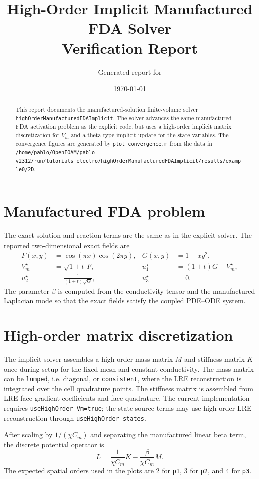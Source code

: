 \documentclass[11pt,a4paper]{article}
\title{High-Order Implicit Manufactured FDA Solver\\Verification Report}
\author{Generated report for \code{highOrderManufacturedFDAImplicit}}
\date{\today}
\newcommand{\code}[1]{\texttt{#1}}
\begin{document}
\maketitle

\begin{abstract}
This report documents the manufactured-solution finite-volume solver \code{highOrderManufacturedFDAImplicit}. The solver advances the same manufactured FDA activation problem as the explicit code, but uses a high-order implicit matrix discretization for $V_m$ and a theta-type implicit update for the state variables. The convergence figures are generated by \code{plot\_convergence.m} from the data in \code{/home/pablo/OpenFOAM/pablo-v2312/run/tutorials\_electro/highOrderManufacturedFDAImplicit/results/example0/2D}.
\end{abstract}

\section{Manufactured FDA problem}
The exact solution and reaction terms are the same as in the explicit solver. The reported two-dimensional exact fields are
\begin{align}
F(x,y) &= \cos(\pi x)\cos(2\pi y), & G(x,y) &= 1+xy^2,\\
V_m^{\star} &= \sqrt{1+t}\,F, &
u_1^{\star} &= (1+t)G+V_m^{\star},\\
u_2^{\star} &= \frac{1}{(1+t)\sqrt{G}}, &
u_3^{\star} &= 0.
\end{align}
The parameter $\beta$ is computed from the conductivity tensor and the manufactured Laplacian mode so that the exact fields satisfy the coupled PDE--ODE system.

\section{High-order matrix discretization}
The implicit solver assembles a high-order mass matrix $M$ and stiffness matrix $K$ once during setup for the fixed mesh and constant conductivity. The mass matrix can be \code{lumped}, i.e. diagonal, or \code{consistent}, where the LRE reconstruction is integrated over the cell quadrature points. The stiffness matrix is assembled from LRE face-gradient coefficients and face quadrature. The current implementation requires \code{useHighOrder\_Vm=true}; the state source terms may use high-order LRE reconstruction through \code{useHighOrder\_states}.

After scaling by $1/(\chi C_m)$ and separating the manufactured linear beta term, the discrete potential operator is
\begin{equation}
L = \frac{1}{\chi C_m}K - \frac{\beta}{\chi C_m}M.
\end{equation}
The expected spatial orders used in the plots are $2$ for \code{p1}, $3$ for \code{p2}, and $4$ for \code{p3}.
\end{document}

